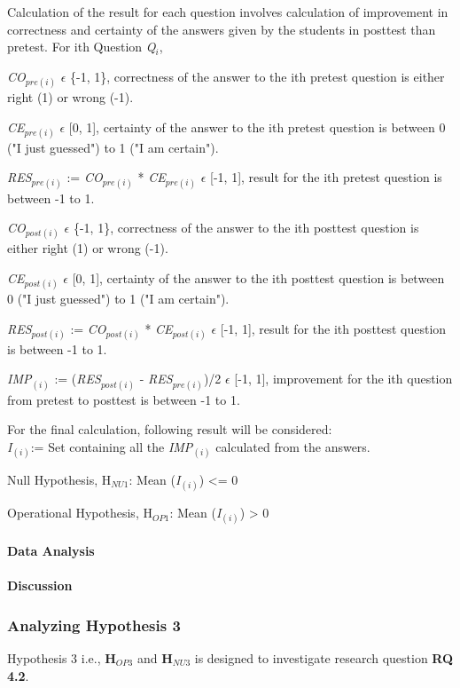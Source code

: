 Calculation of the result for each question involves calculation of improvement in correctness and certainty of the answers given by the students in posttest than pretest.
For ith Question \textit{Q$_{i}$},

\textit{CO$_{pre(i)}$} $\epsilon$ \{-1, 1\}, correctness of the answer to the ith pretest question is either right (1) or wrong (-1).

\textit{CE$_{pre(i)}$} $\epsilon$ [0, 1], certainty of the answer to the ith pretest question is between 0 ("I just guessed") to 1 ("I am certain").

\textit{RES$_{pre(i)}$} := \textit{CO$_{pre(i)}$} * \textit{CE$_{pre(i)}$} $\epsilon$ [-1,  1], result for the ith pretest question is between -1 to 1.

\textit{CO$_{post(i)}$} $\epsilon$ \{-1, 1\}, correctness of the answer to the ith posttest question is either right (1) or wrong (-1).

\textit{CE$_{post(i)}$} $\epsilon$ [0, 1], certainty of the answer to the ith posttest question is between 0 ("I just guessed") to 1 ("I am certain").

\textit{RES$_{post(i)}$} := \textit{CO$_{post(i)}$} * \textit{CE$_{post(i)}$} $\epsilon$ [-1,  1], result for the ith posttest question is between -1 to 1.

\textit{IMP$_{(i)}$} := (\textit{RES$_{post(i)}$} - \textit{RES$_{pre(i)}$})/2 $\epsilon$ [-1,  1], improvement for the ith question from pretest to posttest is between -1 to 1.

For the final calculation, following result will be considered:\\
\textit{I$_{(i)}$}:= Set containing all the \textit{IMP$_{(i)}$} calculated from the answers.

Null Hypothesis, {H$_{NU1}$}: Mean (\textit{I$_{(i)}$}) <= 0

Operational Hypothesis, {H$_{OP1}$}: Mean (\textit{I$_{(i)}$}) > 0

\paragraph{Data Analysis}
\paragraph{Discussion}
\subsubsection{Analyzing Hypothesis 3}\label{subsubsec:hypothesis3}
Hypothesis 3 i.e., \textbf{H$_{OP3}$} and \textbf{H$_{NU3}$} is designed to investigate research question \textbf{RQ 4.2}.

